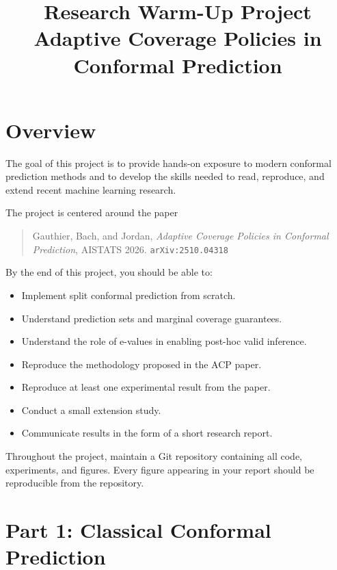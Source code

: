 \documentclass[11pt]{article}
\title{\textbf{Research Warm-Up Project}\\[0.4em]
\large Adaptive Coverage Policies in Conformal Prediction}
\author{}
\date{}
\begin{document}
\maketitle
\thispagestyle{empty}

\bigskip

\section{Overview}

The goal of this project is to provide hands-on exposure to modern conformal
prediction methods and to develop the skills needed to read, reproduce, and
extend recent machine learning research.

The project is centered around the paper

\begin{quote}
  Gauthier, Bach, and Jordan,
  \emph{Adaptive Coverage Policies in Conformal Prediction},
  AISTATS 2026. \texttt{arXiv:2510.04318}
\end{quote}

\noindent By the end of this project, you should be able to:

\begin{itemize}
  \item Implement split conformal prediction from scratch.
  \item Understand prediction sets and marginal coverage guarantees.
  \item Understand the role of e-values in enabling post-hoc valid inference.
  \item Reproduce the methodology proposed in the ACP paper.
  \item Reproduce at least one experimental result from the paper.
  \item Conduct a small extension study.
  \item Communicate results in the form of a short research report.
\end{itemize}

Throughout the project, maintain a Git repository containing all code,
experiments, and figures. Every figure appearing in your report should be
reproducible from the repository.

\section{Part 1: Classical Conformal Prediction}
\end{document}
